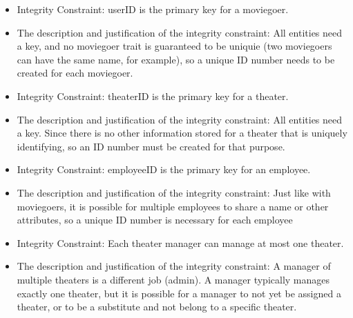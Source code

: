 {\begin{itemize}
\begin{itemize}
\end{itemize}
\begin{itemize} 
\item{ Integrity Constraint: }
userID is the primary key for a moviegoer.
\item{ The description and justification of the integrity constraint: }
All entities need a key, and no moviegoer trait is guaranteed to be uniquie (two moviegoers can have the same name, for example), so a unique ID number needs to be created for each moviegoer.
\end{itemize}
\begin{itemize} 
\item{ Integrity Constraint: }
theaterID is the primary key for a theater.
\item{ The description and justification of the integrity constraint: }
All entities need a key.  Since there is no other information stored for a theater that is uniquely identifying, so an ID number must be created for that purpose.
\end{itemize}
\begin{itemize} 
\item{ Integrity Constraint: }
employeeID is the primary key for an employee.
\item{ The description and justification of the integrity constraint: }
Just like with moviegoers, it is possible for multiple employees to share a name or other attributes, so a unique ID number is necessary for each employee
\end{itemize}
\begin{itemize} 
\item{ Integrity Constraint: }
Each theater manager can manage at most one theater.
\item{ The description and justification of the integrity constraint: }
 A manager of multiple theaters is a different job (admin).  A manager typically manages exactly one theater, but it is possible for a manager to not yet be assigned a theater, or to be a substitute and not belong to a specific theater.
\end{itemize}
\end{itemize}
}
